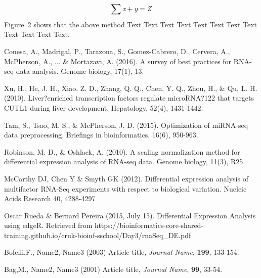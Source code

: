 \documentclass{bioinfo}
\begin{document}
%
%
%
%
%
%
%
%
%

\begin{equation}
\sum \text{\it x}+ \text{\it y} =\text{\it Z}\label{eq:01}\vspace*{-10pt}
\end{equation}
Figure~2\vphantom{\ref{fig:02}} shows that the above method  Text
Text Text Text  Text Text Text Text Text Text  Text Text.



\begin{thebibliography}{}

Conesa, A., Madrigal, P., Tarazona, S., Gomez-Cabrero, D., Cervera, A., McPherson, A., ... \& Mortazavi, A. (2016). A survey of best practices for RNA-seq data analysis. Genome biology, 17(1), 13.

Xu, H., He, J. H., Xiao, Z. D., Zhang, Q. Q., Chen, Y. Q., Zhou, H., \& Qu, L. H. (2010). Liver?enriched transcription factors regulate microRNA?122 that targets CUTL1 during liver development. Hepatology, 52(4), 1431-1442.

 Tam, S., Tsao, M. S., \& McPherson, J. D. (2015). Optimization of miRNA-seq data preprocessing. Briefings in bioinformatics, 16(6), 950-963.

Robinson, M. D., \& Oshlack, A. (2010). A scaling normalization method for differential expression analysis of RNA-seq data. Genome biology, 11(3), R25.

McCarthy DJ, Chen Y \& Smyth GK (2012). Differential expression analysis of multifactor RNA-Seq experiments with respect to biological variation. Nucleic Acids Research 40, 4288-4297

Oscar Rueda \& Bernard Pereira (2015, July 15). Differential Expression Analysis using edgeR. Retrieved from https://bioinformatics-core-shared-training.github.io/cruk-bioinf-sschool/Day3/rnaSeq\_DE.pdf

Bofelli,F., Name2, Name3 (2003) Article title, {\it Journal Name}, {\bf 199}, 133-154.

Bag,M., Name2, Name3 (2001) Article title, {\it Journal Name}, {\bf 99}, 33-54.


\end{thebibliography}
\end{document}
